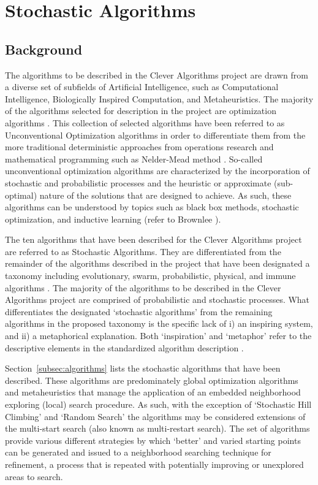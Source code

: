 \documentclass[a4paper, 11pt]{article}
\begin{document}
% 
% 
\section{Stochastic Algorithms}
\label{sec:algorithms}

% 
% 
\subsection{Background}
The algorithms to be described in the Clever Algorithms project are drawn from a diverse set of subfields of Artificial Intelligence, such as Computational Intelligence, Biologically Inspired Computation, and Metaheuristics. The majority of the algorithms selected for description in the project are optimization algorithms \cite{Brownlee2010b}. 
This collection of selected algorithms have been referred to as Unconventional Optimization algorithms in order to differentiate them from the more traditional deterministic approaches from operations research and mathematical programming such as Nelder-Mead method \cite{Brownlee2010n}. So-called unconventional optimization algorithms are characterized by the incorporation of stochastic and probabilistic processes and the heuristic or approximate (sub-optimal) nature of the solutions that are designed to achieve. As such, these algorithms can be understood by topics such as black box methods, stochastic optimization, and inductive learning (refer to Brownlee \cite{Brownlee2010n}). 

The ten algorithms that have been described for the Clever Algorithms project are referred to as Stochastic Algorithms. They are differentiated from the remainder of the algorithms described in the project that have been designated a taxonomy including evolutionary, swarm, probabilistic, physical, and immune algorithms \cite{Brownlee2010b}. 
The majority of the algorithms to be described in the Clever Algorithms project are comprised of probabilistic and stochastic processes. What differentiates the designated `stochastic algorithms' from the remaining algorithms in the proposed taxonomy is the specific lack of i) an inspiring system, and ii) a metaphorical explanation. Both `inspiration' and `metaphor' refer to the descriptive elements in the standardized algorithm description \cite{Brownlee2010a}.

Section~\ref{subsec:algorithms} lists the stochastic algorithms that have been described. These algorithms are predominately global optimization algorithms and metaheuristics that manage the application of an embedded neighborhood exploring (local) search procedure. As such, with the exception of `Stochastic Hill Climbing' and `Random Search' the algorithms may be considered extensions of the multi-start search (also known as multi-restart search). The set of algorithms provide various different strategies by which `better' and varied starting points can be generated and issued to a neighborhood searching technique for refinement, a process that is repeated with potentially improving or unexplored areas to search. 
\end{document}
